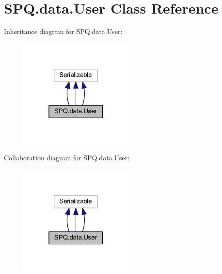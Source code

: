 \hypertarget{class_s_p_q_1_1data_1_1_user}{}\section{S\+P\+Q.\+data.\+User Class Reference}
\label{class_s_p_q_1_1data_1_1_user}


Inheritance diagram for S\+P\+Q.\+data.\+User\+:
\nopagebreak
\begin{figure}[H]
\begin{center}
\leavevmode
\includegraphics[width=163pt]{class_s_p_q_1_1data_1_1_user__inherit__graph}
\end{center}
\end{figure}


Collaboration diagram for S\+P\+Q.\+data.\+User\+:
\nopagebreak
\begin{figure}[H]
\begin{center}
\leavevmode
\includegraphics[width=163pt]{class_s_p_q_1_1data_1_1_user__coll__graph}
\end{center}
\end{figure}
